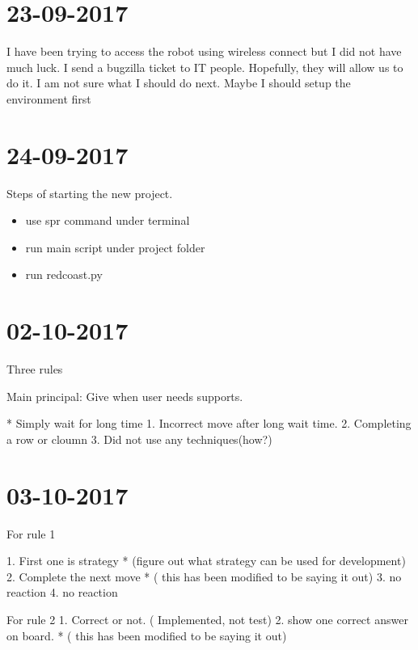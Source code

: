 \documentclass{article}
\begin{document}
 


\begin{abstract} 
\end{abstract} 

\section{23-09-2017}
I have been trying to access the robot using wireless connect but I did not have much luck.
I send a bugzilla ticket to IT people. Hopefully, they will allow us to do it.
I am not sure what I should do next. Maybe I should setup the environment first

\section{24-09-2017}
Steps of starting the new project.
\begin{itemize}
\item use spr command under terminal
\item run main script under project folder
\item run redcoast.py 
\end{itemize}

\section{02-10-2017}
Three rules

Main principal:
Give when user needs supports.

* Simply wait for long time
1. Incorrect move after long wait time.
2. Completing a row or cloumn
3. Did not use any techniques(how?)

\section{03-10-2017}
For rule 1 

1. First one is strategy * (figure out what strategy can be used for development)
2. Complete the next move * ( this has been modified to be saying it out)
3. no reaction
4. no reaction

For rule 2
1. Correct or not. ( Implemented, not test)
2. show one correct answer on board. * ( this has been modified to be saying it out)
\end{document}
